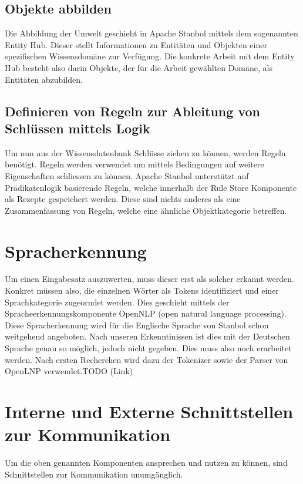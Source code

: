 \subsection{Objekte abbilden}
\label{sec:architektur_wissensdatenbank_Objekte}
Die Abbildung der Umwelt geschieht in Apache Stanbol mittels dem sogenannten Entity Hub.
Dieser stellt Informationen zu Entitäten und Objekten einer spezifischen Wissensdomäne zur Verfügung. Die konkrete Arbeit mit dem Entity Hub besteht also darin Objekte, der für die Arbeit gewählten Domäne, als Entitäten abzubilden.
\subsection{Definieren von Regeln zur Ableitung von Schlüssen mittels Logik}
\label{sec:architektur_regeln}
Um nun aus der Wissensdatenbank Schlüsse ziehen zu können, werden Regeln benötigt. Regeln werden verwendet um mittels Bedingungen auf weitere Eigenschaften schliessen zu können.
Apache Stanbol unterstützt auf Prädikatenlogik basierende Regeln, welche innerhalb der Rule Store Komponente als Rezepte gespeichert werden. Diese sind nichts anderes als eine Zusammenfassung von Regeln, welche eine ähnliche Objektkategorie betreffen.

\section{Spracherkennung}
\label{sec:architektur_spracherkennung}
Um einen Eingabesatz auszuwerten, muss dieser erst als solcher erkannt werden. Konkret müssen also, die einzelnen Wörter als Tokens identifiziert und einer Sprachkategorie zugeorndet werden. Dies geschieht mittels der Spracheerkennungskomponente OpenNLP (open natural language processing). Diese Spracherkennung wird für die Englische Sprache von Stanbol schon weitgehend angeboten. Nach unseren Erkenntinissen ist dies mit der Deutschen Sprache genau so möglich, jedoch nicht gegeben. Dies muss also noch erarbeitet werden. Nach ersten Recherchen wird dazu der Tokenizer sowie der Parser von OpenLNP verwendet.TODO (Link)

\section{Interne und Externe Schnittstellen zur Kommunikation}
 \label{sec:architektur_schnittstellen}
Um die oben genannten Komponenten ansprechen und nutzen zu können, sind Schnittstellen zur Kommunikation unumgänglich.

